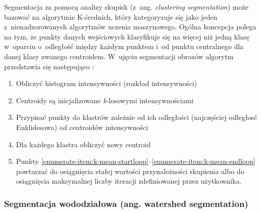 \documentclass[conference]{IEEEtran}
\begin{document}
Segmentacja za pomocą analizy skupisk (z~ang. \textit{clustering segmentation}) może bazować na algorytmie K-średnich, który kategoryzuje się jako jeden z~nienadzorowanych algorytmów uczenia maszynowego. Ogólna koncepcja polega na tym, że punkty danych wejściowych klasyfikuje się na więcej niż jedną klasę w~oparciu o~odległość między każdym punktem i~od punktu centralnego dla danej klasy zwanego centroidem.
W~ujęciu segmentacji obrazów algorytm przedstawia się następująco \cite{b5}:
\begin{enumerate}
\item Obliczyć histogram intensywności (rozkład intensywności)
\item Centroidy są inicjalizowane \textit{k}-losowymi intensywnościami
\item  Przypisać punkty do klastrów zależnie od ich odległości (najczęściej odległosć Euklidesowa) od centroidów intensywności
\label{enumerate-item:k-mean-startloop}
\item \label{enumerate-item:k-mean-endloop}Dla każdego klastra obliczyć nowy centroid
\item Punkty \ref{enumerate-item:k-mean-startloop}--\ref{enumerate-item:k-mean-endloop} powtarzać do osiągnięcia stałej wartości przynależności skupienia albo do osiągnięcia maksymalnej liczby iteracji zdefiniowanej przez użytkownika.
\end{enumerate}


\subsubsection{Segmentacja wododziałowa (ang. watershed segmentation)}
\end{document}
